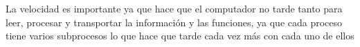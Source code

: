 \documentclass{article}
\begin{document}
	La velocidad es importante ya que hace que el computador no tarde tanto para leer, procesar y transportar la información y las funciones, ya que cada proceso tiene varios subprocesos lo que hace que tarde cada vez más con cada uno de ellos
	\vfill
	\newpage
	
	
	
	
	
	
\end{document}
